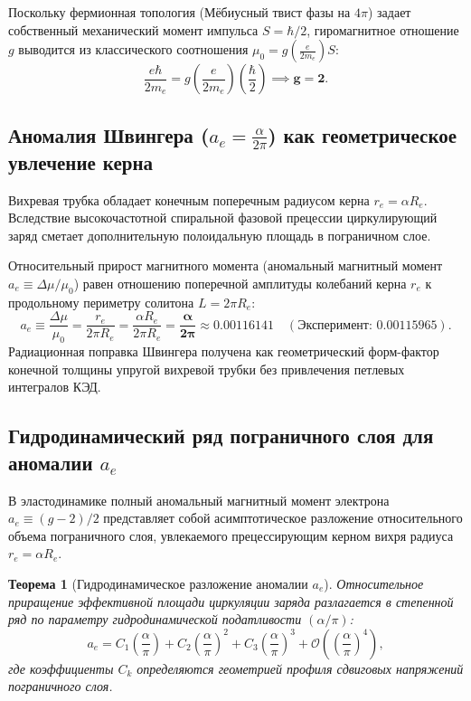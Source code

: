 \documentclass[12pt,a4paper]{article}
\newtheorem{theorem}{Теорема}
\begin{document}
	Поскольку фермионная топология (Мёбиусный твист фазы на $4\pi$) задает собственный механический момент импульса $S = \hbar/2$, гиромагнитное отношение $g$ выводится из классического соотношения $\mu_0 = g \left( \frac{e}{2 m_e} \right) S$:
	\begin{equation}
		\frac{e \hbar}{2 m_e} = g \left( \frac{e}{2 m_e} \right) \left( \frac{\hbar}{2} \right) \implies \mathbf{g = 2}.
	\end{equation}
	
	\subsection{Аномалия Швингера ($a_e = \frac{\alpha}{2\pi}$) как геометрическое увлечение керна}
	Вихревая трубка обладает конечным поперечным радиусом керна $r_e = \alpha R_e$. Вследствие высокочастотной спиральной фазовой прецессии циркулирующий заряд сметает дополнительную полоидальную площадь в пограничном слое.
	
	Относительный прирост магнитного момента (аномальный магнитный момент $a_e \equiv \Delta \mu / \mu_0$) равен отношению поперечной амплитуды колебаний керна $r_e$ к продольному периметру солитона $L = 2\pi R_e$:
	\begin{equation}
		a_e \equiv \frac{\Delta \mu}{\mu_0} = \frac{r_e}{2\pi R_e} = \frac{\alpha R_e}{2\pi R_e} = \mathbf{\frac{\alpha}{2\pi}} \approx \mathbf{0.00116141} \quad (\text{Эксперимент: } 0.00115965).
	\end{equation}
	Радиационная поправка Швингера получена как геометрический форм-фактор конечной толщины упругой вихревой трубки без привлечения петлевых интегралов КЭД.
	
	\subsection{Гидродинамический ряд пограничного слоя для аномалии $a_e$}
	В эластодинамике полный аномальный магнитный момент электрона $a_e \equiv (g-2)/2$ представляет собой асимптотическое разложение относительного объема пограничного слоя, увлекаемого прецессирующим керном вихря радиуса $r_e = \alpha R_e$.
	
	\begin{theorem}[Гидродинамическое разложение аномалии $a_e$]
		Относительное приращение эффективной площади циркуляции заряда разлагается в степенной ряд по параметру гидродинамической податливости $(\alpha/\pi)$:
		\begin{equation}
			a_e = C_1 \left(\frac{\alpha}{\pi}\right) + C_2 \left(\frac{\alpha}{\pi}\right)^2 + C_3 \left(\frac{\alpha}{\pi}\right)^3 + \mathcal{O}\left( \left(\frac{\alpha}{\pi}\right)^4 \right),
		\end{equation}
		где коэффициенты $C_k$ определяются геометрией профиля сдвиговых напряжений пограничного слоя.
	\end{theorem}
	
\end{document}
